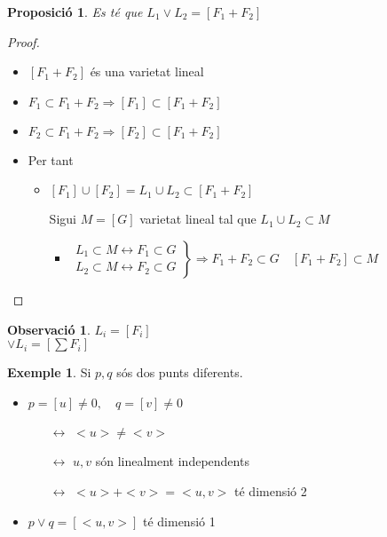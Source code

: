 \documentclass{article}
\newtheorem{proposition}[theorem]{Proposició}
\theoremstyle{definition}
\newtheorem{example}[theorem]{Exemple}
\newtheorem{observation}[theorem]{Observació}
\begin{document}
\begin{proposition}
Es té que $L_1 \vee L_2 = [F_1 + F_2]$
\end{proposition}
\begin{proof}
\begin{itemize}
\item $[F_1 + F_2]$ és una varietat lineal
\item $F_1 \subset F_1 + F_2 \Rightarrow [F_1] \subset [F_1 + F_2]$
\item $F_2 \subset F_1 + F_2 \Rightarrow [F_2] \subset [F_1 + F_2]$
\item Per tant
	\begin{itemize}
	\item $[F_1] \cup [F_2] = L_1 \cup L_2 \subset [F_1 + F_2]$
	\item[Sigui] $M = [G]$ varietat lineal tal que $L_1 \cup L_2 \subset M$
		\begin{itemize}
		\item $\left.\begin{array}{c}
		L_1 \subset M \leftrightarrow F_1 \subset G\\
		L_2 \subset M \leftrightarrow F_2 \subset G\end{array}\right\}\Rightarrow F_1 + F_2 \subset G\quad [F_1 + F_2] \subset M$
		\end{itemize}
	\end{itemize}
\end{itemize}
\end{proof}

\begin{observation}
$L_i = [F_i]$\\$\vee L_i = [\sum F_i]$
\end{observation}

\begin{example}
Si $p, q$ sós dos punts diferents.
\begin{itemize}
\item $p = [u] \neq 0, \quad q = [v] \neq 0$
	\begin{itemize}
	\item[$\leftrightarrow$] $<u> \neq <v>$
	\item[$\leftrightarrow$] $u, v$ són linealment independents
	\item[$\leftrightarrow$] $<u> + <v> = <u, v>$ té dimensió 2
	\end{itemize}
\item $p \vee q = [<u, v>]$ té dimensió 1
\end{itemize}
\end{example}
\end{document}
